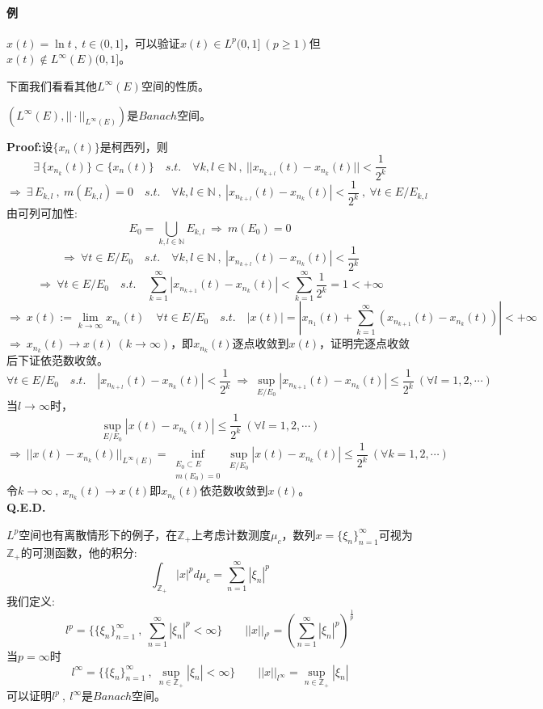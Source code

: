 \paragraph*{例} \quad $x(t)=\ln t \ , \ t \in (0,1]$，可以验证$x(t) \in L^p(0,1] \ (p \geq 1)$但$x(t) \notin L^{\infty}(E)(0,1]$。

下面我们看看其他$L^{\infty}(E)$空间的性质。
\begin{theorem}
    $(L^{\infty}(E),||\cdot||_{L^{\infty}(E)})$是$Banach$空间。
\end{theorem}
\textbf{Proof:}设$\{x_n(t)\}$是柯西列，则
\[\exists \, \{x_{n_{k}}(t)\} \subset \{x_n(t)\} \quad s.t. \quad \forall k,l \in \mathbb{N} \ , \ ||x_{n_{k+l}}(t)-x_{n_{k}}(t)||<\frac{1}{2^k}\]
\[\Rightarrow \ \exists \, E_{k,l} \ , \ m(E_{k,l})=0 \quad s.t. \quad \forall k,l \in \mathbb{N} \ , \ |x_{n_{k+l}}(t)-x_{n_{k}}(t)|<\frac{1}{2^k} \ , \ \forall t \in E/E_{k,l}\]
由可列可加性:
\[E_0=\bigcup_{k,l\in \mathbb{N}}E_{k,l} \ \Rightarrow \ m(E_0)=0\]
\[\Rightarrow \ \forall t \in E/E_0 \quad s.t. \quad \forall k,l \in \mathbb{N} \ , \ |x_{n_{k+l}}(t)-x_{n_{k}}(t)|<\frac{1}{2^k}\]
\[\Rightarrow \ \forall t \in E/E_0 \quad s.t. \quad \sum_{k=1}^{\infty}|x_{n_{k+1}}(t)-x_{n_{k}}(t)|<\sum_{k=1}^{\infty}\frac{1}{2^k}=1<+\infty\]
\[\Rightarrow \ x(t):=\lim_{k \to \infty}x_{n_k}(t) \quad \forall t \in E/E_0 \quad s.t. \quad |x(t)|=\left|x_{n_1}(t)+\sum_{k=1}^{\infty}(x_{n_{k+1}}(t)-x_{n_{k}}(t))\right|<+\infty\]
$\Rightarrow \ x_{n_k}(t) \to x(t) \ (k \to \infty)$，即$x_{n_k}(t)$逐点收敛到$x(t)$，证明完逐点收敛后下证依范数收敛。
\[\forall t \in E/E_0 \quad s.t. \quad |x_{n_{k+l}}(t)-x_{n_{k}}(t)|<\frac{1}{2^k} \ \Rightarrow \ \mathop \text{sup}\limits_{E/E_0}|x_{n_{k+1}}(t)-x_{n_{k}}(t)| \leq \frac{1}{2^k} \ (\forall l=1,2,\cdots)\]
当$l \to \infty$时，
\[\mathop \text{sup}\limits_{E/E_0}|x(t)-x_{n_{k}}(t)| \leq \frac{1}{2^k} \ (\forall l=1,2,\cdots)\]
\[\Rightarrow \ ||x(t)-x_{n_k}(t)||_{L^{\infty}(E)}=\mathop \text{inf}\limits_{\substack{E_0 \subset E \\ m(E_0)=0}} \mathop \text{sup}\limits_{E/E_0}|x(t)-x_{n_{k}}(t)| \leq \frac{1}{2^k} \ (\forall k=1,2,\cdots)\]
令$k \to \infty \ , \ x_{n_k}(t) \to x(t)$即$x_{n_k}(t)$依范数收敛到$x(t)$。\\
\textbf{Q.E.D.}

$L^p$空间也有离散情形下的例子，在$\mathbb{Z}_+$上考虑计数测度$\mu_c$，数列$x=\{\xi_n\}_{n=1}^{\infty}$可视为$\mathbb{Z}_+$的可测函数，他的积分:
\[\int_{\mathbb{Z}_+}|x|^pd\mu_c=\sum_{n=1}^{\infty}|\xi_n|^p\]
我们定义:
\[l^p=\{\{\xi_n\}_{n=1}^{\infty} \ , \ \sum_{n=1}^{\infty}|\xi_n|^p<\infty\} \qquad ||x||_{l^p}=\left(\sum_{n=1}^{\infty}|\xi_n|^p\right)^{\frac{1}{p}}\]
当$p=\infty$时
\[l^{\infty}=\{\{\xi_n\}_{n=1}^{\infty} \ , \ \mathop \text{sup}\limits_{n \in \mathbb{Z}_+}|\xi_n|<\infty\} \qquad ||x||_{l^{\infty}}=\mathop \text{sup}\limits_{n \in \mathbb{Z}_+}|\xi_n|\]
可以证明$l^p \ , \ l^{\infty}$是$Banach$空间。
